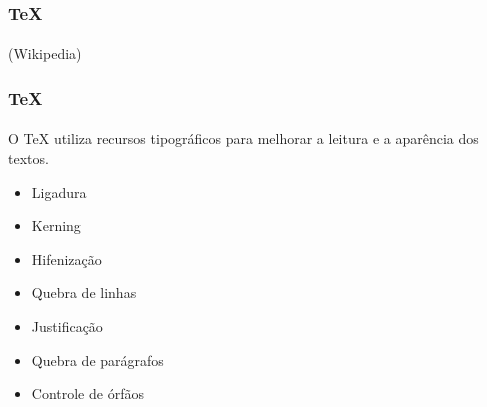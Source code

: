 \begin{frame}
\frametitle{\TeX{}}
\framesubtitle{}
\begin{flushleft}
\hspace{1.1em}\footnotesize{(Wikipedia)}
\end{flushleft}
\end{frame}

\begin{frame} 
\frametitle{\TeX{}}
\framesubtitle{}

O \TeX{} utiliza recursos tipográficos para melhorar a leitura e
a aparência dos textos.

\begin{itemize}
  \item Ligadura
  \item Kerning
  \item Hifenização
  \item Quebra de linhas
  \item Justificação
  \item Quebra de parágrafos
  \item Controle de órfãos 
\end{itemize}
\end{frame}

